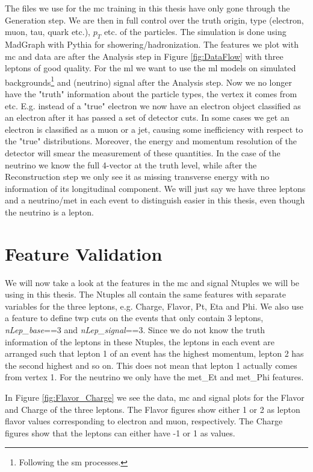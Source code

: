 \documentclass[a4paper, american, 12pt]{report}
\begin{document}
	The files we use for the \acrshort{mc} training in this thesis have only gone through the Generation step. We are then in full control over the truth origin, type (electron, muon, tau, quark etc.), $p_T$ etc. of the particles. The simulation is done using MadGraph\cite{MadGraph} with Pythia\cite{pythia} for showering/hadronization. The features we plot with \acrshort{mc} and data are after the Analysis step in Figure \ref{fig:DataFlow} with three leptons of good quality. For the \acrshort{ml} we want to use the \acrshort{ml} models on simulated backgrounds\footnote{Following the \acrshort{sm} processes.} and (neutrino) signal after the Analysis step. Now we no longer have the "truth" information about the particle types, the vertex it comes from etc. E.g. instead of a "true" electron we now have an electron object classified as an electron after it has passed a set of detector cuts. In some cases we get an electron is classified as a muon or a jet, causing some inefficiency with respect to the "true" distributions. Moreover, the energy and momentum resolution of the detector will smear the measurement of these quantities. In the case of the neutrino we know the full 4-vector at the truth level, while after the Reconstruction step we only see it as missing transverse energy with no information of its longitudinal component. We will just say we have three leptons and a neutrino/\acrshort{met} in each event to distinguish easier in this thesis, even though the neutrino is a lepton.


	\section{Feature Validation}
	\label{sect:Method-Features}
	We will now take a look at the features in the \acrshort{mc} and signal Ntuples we will be using in this thesis. The Ntuples all contain the same features with separate variables for the three leptons, e.g. Charge, Flavor, Pt, Eta and Phi. We also use a feature to define twp cuts on the events that only contain 3 leptons, \textit{nLep\_base}==3 and \textit{nLep\_signal}==3. Since we do not know the truth information of the leptons in these Ntuples, the leptons in each event are arranged such that lepton 1 of an event has the highest momentum, lepton 2 has the second highest and so on. This does not mean that lepton 1 actually comes from vertex 1. For the neutrino we only have the met\_Et and met\_Phi features.
	
	In Figure \ref{fig:Flavor_Charge} we see the data, \acrshort{mc} and signal plots for the Flavor and Charge of the three leptons. The Flavor figures show either 1 or 2 as lepton flavor values corresponding to electron and muon, respectively. The Charge figures show that the leptons can either have -1 or 1 as values.
	
\end{document}
